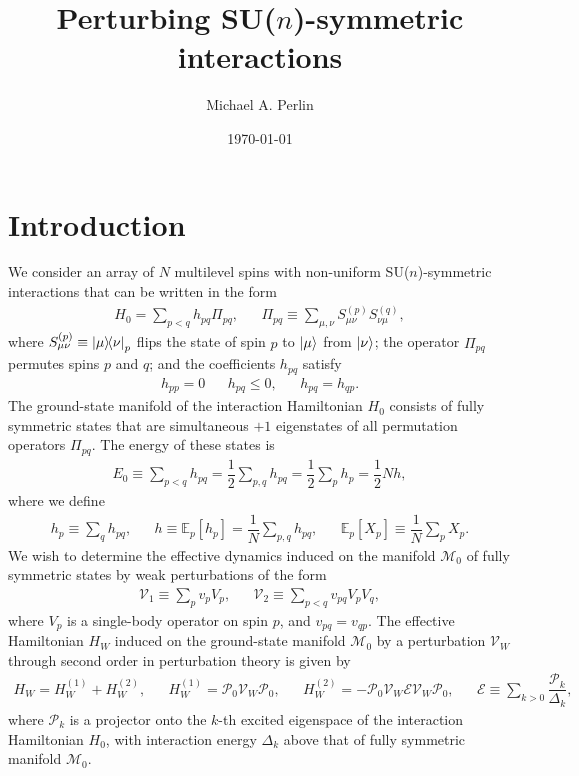 \documentclass[nofootinbib,notitlepage,11pt]{revtex4-2}
\newcommand{\f}[2]{\dfrac{#1}{#2}} %
\renewcommand{\sp}[1]{\left[#1\right]} %
\newcommand{\1}{\mathds{1}}
\newcommand{\E}{\mathcal{E}}
\newcommand{\M}{\mathcal{M}}
\renewcommand{\P}{\mathcal{P}}
\newcommand{\V}{\mathcal{V}}
\newcommand{\EE}{\mathbb{E}}
\begin{document}
\title{Perturbing SU($n$)-symmetric interactions}%
\author{Michael A. Perlin}%
\date{\today}

\maketitle

\tableofcontents

\section{Introduction}

We consider an array of $N$ multilevel spins with non-uniform
SU($n$)-symmetric interactions that can be written in the form
\begin{align}
  H_0 = \sum_{p<q} h_{pq} \Pi_{pq},
  &&
  \Pi_{pq} \equiv \sum_{\mu,\nu} S_{\mu\nu}^{(p)} S_{\nu\mu}^{(q)},
\end{align}
where $S_{\mu\nu}^{(p)}\equiv\op{\mu}{\nu}_p$ flips the state of spin
$p$ to $\ket\mu$ from $\ket\nu$; the operator $\Pi_{pq}$ permutes
spins $p$ and $q$; and the coefficients $h_{pq}$ satisfy
\begin{align}
  h_{pp} = 0
  &&
  h_{pq} \le 0,
  &&
  h_{pq} = h_{qp}.
\end{align}
The ground-state manifold of the interaction Hamiltonian $H_0$
consists of fully symmetric states that are simultaneous $+1$
eigenstates of all permutation operators $\Pi_{pq}$.  The energy of
these states is
\begin{align}
  E_0 \equiv \sum_{p<q} h_{pq} = \f12 \sum_{p,q} h_{pq}
  = \f12 \sum_p h_p = \f12 N h,
\end{align}
where we define
\begin{align}
  h_p \equiv \sum_q h_{pq},
  &&
  h \equiv \EE_p\sp{h_p} = \f1N \sum_{p,q} h_{pq},
  &&
  \EE_p\sp{X_p} \equiv \f1N \sum_p X_p.
\end{align}
We wish to determine the effective dynamics induced on the manifold
$\M_0$ of fully symmetric states by weak perturbations of the form
\begin{align}
  \V_1 \equiv \sum_p v_p V_p,
  &&
  \V_2 \equiv \sum_{p<q} v_{pq} V_p V_q,
  \label{eq:perturbations}
\end{align}
where $V_p$ is a single-body operator on spin $p$, and
$v_{pq}=v_{qp}$.  The effective Hamiltonian $H_W$ induced on the
ground-state manifold $\M_0$ by a perturbation $\V_W$ through second
order in perturbation theory is given by\cite{bravyi2011schrieffer,
  perlin2019effective}
\begin{align}
  H_W = H_W^{(1)} + H_W^{(2)},
  &&
  H_W^{(1)} = \P_0 \V_W \P_0,
  &&
  H_W^{(2)} = - \P_0 \V_W \E \V_W \P_0,
  &&
  \E \equiv \sum_{k>0} \f{\P_k}{\Delta_k},
\end{align}
where $\P_k$ is a projector onto the $k$-th excited eigenspace of the
interaction Hamiltonian $H_0$, with interaction energy $\Delta_k$
above that of fully symmetric manifold $\M_0$.
\end{document}
